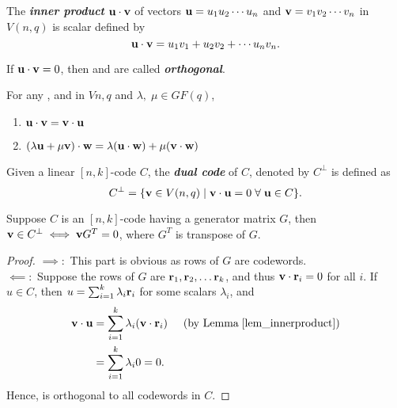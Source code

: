 \documentclass[../main.tex]{subfiles}
\begin{document}
	
\begin{defn}
	The \textbf{\emph{inner product}} $\textbf{u}\cdot \textbf{v}$ of vectors $\textbf{u}=u_1u_2\cdots u_n$ and $\textbf{v}=v_1v_2\cdots v_n$ in $V(n,q)$ is scalar defined by
	\[
		\textbf{u}\cdot \textbf{v} = u_1v_1 + u_2v_2+\cdots u_nv_n.
	\]
\end{defn}	
If $\textbf{u}\cdot \textbf{v}=0$, then  and  are called \textbf{\emph{orthogonal}}.\\

\begin{lem}\label{lem_innerproduct}
	For any ,  and  in $V{n,q}$ and $\lambda,\; \mu \in GF(q)$, 
	\begin{enumerate}
	\itemsep-1mm
		\item $\textbf{u}\cdot \textbf{v} = \textbf{v} \cdot \textbf{u}$
		\item $(\lambda \textbf{u}+\mu \textbf{v})\cdot \textbf{w} = \lambda(\textbf{u}\cdot \textbf{w})+ \mu(\textbf{v}\cdot \textbf{w})$
	\end{enumerate}
\end{lem}

\begin{defn}
	Given a linear $[n,k]$-code $C$, the \textbf{\emph{dual code}} of $C$, denoted by $C^{\perp}$ is defined as
	\[
		C^{\perp} = \{\textbf{v}\in V(n,q) \;|\; \textbf{v}\cdot \textbf{u}=0 \;\forall\; \textbf{u} \in C\}.
	\]
\end{defn}

\begin{lem}\label{lem_dual-necessary}
	Suppose $C$ is an $[n,k]$-code having a generator matrix $G$, then $\textbf{v}\in C^{\perp} \iff \textbf{v}G^T=0$, where $G^T$ is transpose of $G$.
\end{lem}
\begin{proof}
	$\implies :$ This part is obvious as rows of $G$ are codewords.\\
	$\impliedby :$ Suppose the rows of $G$ are $\textbf{r}_1,\textbf{r}_2,\ldots \textbf{r}_k$, and thus $\textbf{v}\cdot \textbf{r}_i=0$ for all $i$. If $u\in C$, then $u=\sum_{i=1}^{k}\lambda_i\textbf{r}_i$ for some scalars $\lambda_i$, and
	\begin{align*}
		\textbf{v}\cdot \textbf{u} &=\displaystyle\sum_{i=1}^{k}\lambda_i(\textbf{v}\cdot \textbf{r}_i)\hspace{5mm} (\text{by Lemma}\; \ref{lem_innerproduct})\\
		&=\displaystyle\sum_{i=1}^k\lambda_i0=0.
	\end{align*}
	Hence,  is orthogonal to all codewords in $C$.
\end{proof}
\end{document}

